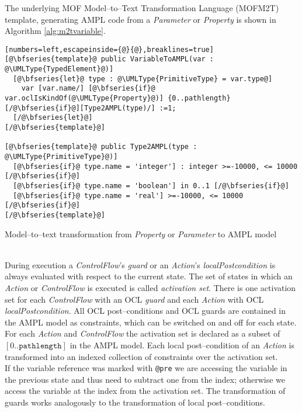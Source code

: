\documentclass[runningheads,a4paper]{llncs}%
\newcommand{\UMLType}[1]{\textsf{\textit{#1}}} %
\newcommand{\UMLReference}[1]{\textsf{\textit{#1}}} %
\begin{document}
The underlying MOF Model--to--Text Transformation Language\cite{m2t.standard} (MOFM2T) template, generating AMPL code from a \UMLType{Parameter} or \UMLType{Property} is shown in Algorithm \ref{alg:m2tvariable}.
\begin{algorithm}
\begin{lstlisting}[numbers=left,escapeinside={@}{@},breaklines=true]
[@\bfseries{template}@ public VariableToAMPL(var : @\UMLType{TypedElement}@)]
  [@\bfseries{let}@ type : @\UMLType{PrimitiveType} = var.type@]
    var [var.name/] [@\bfseries{if}@ var.oclIsKindOf(@\UMLType{Property}@)] {0..pathlength} [/@\bfseries{if}@][Type2AMPL(type)/] :=1;
  [/@\bfseries{let}@]
[/@\bfseries{template}@]

[@\bfseries{template}@ public Type2AMPL(type : @\UMLType{PrimitiveType}@)]
  [@\bfseries{if}@ type.name = 'integer'] : integer >=-10000, <= 10000 [/@\bfseries{if}@]
  [@\bfseries{if}@ type.name = 'boolean'] in 0..1 [/@\bfseries{if}@]
  [@\bfseries{if}@ type.name = 'real'] >=-10000, <= 10000 [/@\bfseries{if}@]
[/@\bfseries{template}@]
\end{lstlisting}%
\caption{Model--to--text transformation from \UMLType{Property} or \UMLType{Parameter} to AMPL model}%
\label{alg:m2tvariable}%
\end{algorithm}\\%
During execution a \UMLType{ControlFlow}'s \UMLReference{guard} or an \UMLType{Action}'s \UMLReference{localPostcondition} is always evaluated with respect to the current state. The set of states in which an \UMLType{Action} or \UMLType{ControlFlow} is executed is called \emph{activation set}. There is one activation set for each \UMLType{ControlFlow} with an OCL \UMLReference{guard} and each \UMLType{Action} with OCL \UMLReference{localPostcondition}. %
All OCL post--conditions and OCL guards are contained in the AMPL model as constraints, which can be switched on and off for each state. %
%
For each \UMLType{Action} and \UMLType{ControlFlow} the activation set is declared as a subset of $\left[0..\texttt{pathlength}\right]$ in the AMPL model. Each local post--condition of an \UMLType{Action} is transformed into an indexed collection of constraints over the activation set.\\
If the variable reference was marked with \verb=@pre= we are accessing the variable in the previous state and thus need to subtract one from the index; otherwise we access the variable at the index from the activation set. %
The transformation of guards works analogously to the transformation of local post--conditions.
\end{document}
